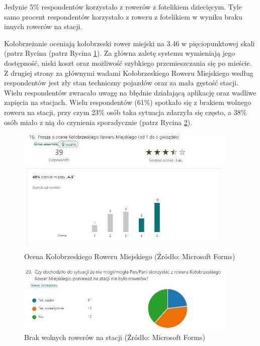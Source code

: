 \documentclass{amuthesis}
\begin{document}
Jedynie 5\% respondentów korzystało z rowerów z fotelikiem dziecięcym.
Tyle samo procent respondentów korzystało z roweru z fotelikiem w wyniku braku innych rowerów na stacji.

Kołobrzeżanie oceniają kołobrzeski rower miejski na 3.46 w pięciopunktowej skali (patrz Rycina (patrz Rycina \ref{fig:ankieta16}).
Za główna zaletę systemu wymieniają jego dostępność, niski koszt oraz możliwość szybkiego przemieszczania się po mieście.
Z drugiej strony za głównymi wadami Kołobrzeskiego Roweru Miejskiego według respondentów jest zły stan techniczny pojazdów oraz za mała gęstość stacji.
Wielu respondentów zwracało uwagę na błędnie działającą aplikację oraz wadliwe zapięcia na stacjach.
Wielu respondentów (61\%) spotkało się z brakiem wolnego roweru na stacji, przy czym 23\% osób taka sytuacja zdarzyła się często, a 38\% osób miało z nią do czynienia sporadycznie (patrz Rycina \ref{fig:ankieta20}).

\begin{figure}[t]

{\centering \includegraphics[width=400px]{figures/ankieta/16} 

}

\caption{Ocena Kołobrzeskiego Roweru Miejskiego (Źródło: Microsoft Forms)}\label{fig:ankieta16}
\end{figure}

\begin{figure}[t]

{\centering \includegraphics[width=400px]{figures/ankieta/20} 

}

\caption{Brak wolnych rowerów na stacji (Źródło: Microsoft Forms)}\label{fig:ankieta20}
\end{figure}
\end{document}
